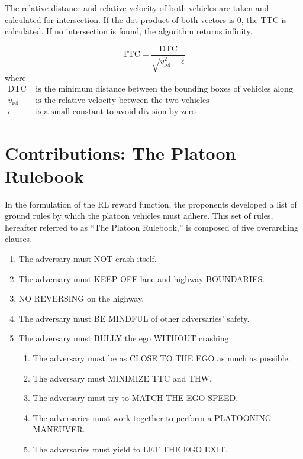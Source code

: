 \documentclass[12pt, a4paper]{report}
\begin{document}
The relative distance and relative velocity of both vehicles are taken and calculated for intersection. If the dot product of both vectors is 0, the TTC is calculated. If no intersection is found, the algorithm returns infinity.

\begin{equation}
    \mathrm{TTC} = \frac{\mathrm{DTC}}{\sqrt{v_{\text{rel}}^2 + \epsilon}}
\end{equation}
where
\begin{align}
    \mathrm{DTC} & \text{ is the minimum distance between the bounding boxes of vehicles along direction of relative velocity} \\
    v_{\text{rel}} & \text{ is the relative velocity between the two vehicles} \\
    \epsilon & \text{ is a small constant to avoid division by zero}
\end{align}

\section{Contributions: The Platoon Rulebook}

In the formulation of the RL reward function, the proponents developed a list of ground rules by which the platoon vehicles must adhere. This set of rules, hereafter referred to as “The Platoon Rulebook,” is composed of five overarching clauses.

\begin{enumerate}
    \item The adversary must NOT crash itself.
    \item The adversary must KEEP OFF lane and highway BOUNDARIES.
    \item NO REVERSING on the highway.
    \item The adversary must BE MINDFUL of other adversaries’ safety.
    \item The adversary must BULLY the ego WITHOUT crashing.
    \begin{enumerate}
        \item The adversary must be as CLOSE TO THE EGO as much as possible.
        \item The adversary must MINIMIZE TTC and THW.
        \item The adversary must try to MATCH THE EGO SPEED.
        \item The adversaries must work together to perform a PLATOONING MANEUVER.
        \item The adversaries must yield to LET THE EGO EXIT.
    \end{enumerate}
\end{enumerate}
\end{document}
